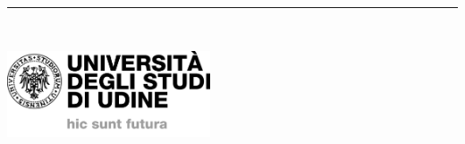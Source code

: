 %
\begin{titlepage}
	\flushright\hfill
	\vfill
	{\LARGE\thesisTitle\par}
	\rule[5pt]{\textwidth}{.4pt} \par
	{\Large\thesisName}
	\vfill
	\textit{\large\thesisDate} \\
\end{titlepage}


\begin{titlepage}
	\tgherosfont\centering

	\includegraphics[width=6cm]{gfx/logo.jpeg} \\[2mm]
	\textsf{\thesisUniversityDepartment} \\
	\textsf{\thesisUniversityGroup} \\

	\vfill
	{\large \thesisSubject} \\[5mm]
	{\LARGE \color{ctcolortitle}\textbf{\thesisTitle} \\[10mm]}
	{\Large \thesisName} \\

	\vfill

	\normalfont{}
\end{titlepage}
